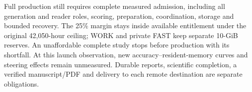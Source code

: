 Full production still requires complete measured admission, including all
generation and reader roles, scoring, preparation, coordination, storage and
bounded recovery. The 25\% margin stays inside available entitlement under the
original 42,050-hour ceiling; WORK and private FAST keep separate 10-GiB reserves.
An unaffordable complete study stops before production with its shortfall.
At this launch observation, new accuracy--resident-memory curves and steering
effects remain unmeasured. Durable reports, scientific completion, a verified
manuscript/PDF and delivery to each remote destination are separate obligations.
